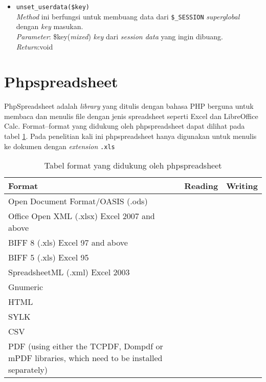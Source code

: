 \begin{itemize}
	\item \texttt{unset\_userdata(\$key)} \\
	\textit{Method} ini berfungsi untuk membuang data dari \texttt{\$\_SESSION} \textit{superglobal} dengan \textit{key} masukan. \\ 
	\textit{Parameter}: \$key(\textit{mixed}) \textit{key} dari \textit{session data} yang ingin dibuang. \\
	\textit{Return}:void 
	
\end{itemize}

\section{Phpspreadsheet}
\label{section:phpspreadsheet}

PhpSpreadsheet adalah \textit{library} yang ditulis dengan bahasa PHP berguna untuk membaca dan menulis file dengan jenis spreadsheet seperti Excel dan LibreOffice Calc\cite{phpspreadsheet}. Format--format yang didukung oleh phpspreadsheet dapat dilihat pada tabel \ref{tab:phpspreadsheet supported}. Pada penelitian kali ini phpspreadsheet hanya digunakan untuk menulis ke dokumen dengan \textit{extension} \texttt{.xls}

\begin{table}[H]
	\centering
	\begin{tabular}{|p{}|c|c|}
		\hline
		\textbf{Format} & \textbf{Reading} & \textbf{Writing} \\ \hline
		Open Document Format/OASIS (.ods) & \checkmark & \checkmark \\ \hline
		Office Open XML (.xlsx) Excel 2007 and above & \checkmark & \checkmark \\ \hline
		BIFF 8 (.xls) Excel 97 and above & \checkmark & \checkmark \\ \hline
		BIFF 5 (.xls) Excel 95 & \checkmark  & \\ \hline
		SpreadsheetML (.xml) Excel 2003 & \checkmark & \\ \hline
		Gnumeric & \checkmark & \\ \hline
		HTML & \checkmark & \checkmark \\ \hline
		SYLK & \checkmark & \\ \hline
		CSV & \checkmark & \checkmark \\ \hline
		PDF (using either the TCPDF, Dompdf or mPDF libraries, which need to be installed separately) & & \checkmark \\ 
		\hline
	\end{tabular}
\caption{Tabel format yang didukung oleh phpspreadsheet}
\label{tab:phpspreadsheet supported}
\end{table}

